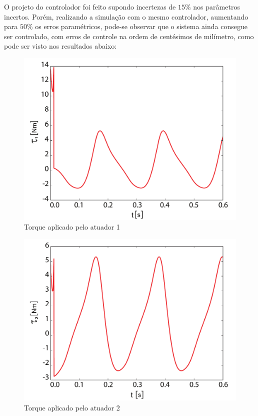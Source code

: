 \documentclass[]{politex}
\begin{document}
O projeto do controlador foi feito supondo incertezas de $15\%$ nos parâmetros incertos. Porém, realizando a simulação com o mesmo controlador, aumentando para $50\%$ os erros paramétricos, pode-se observar que o sistema ainda consegue ser controlado, com erros de controle na ordem de centésimos de milímetro, como pode ser visto nos resultados abaixo: 

\begin{multicols}{2}
\begin{figure}[H]
	\centering
	\includegraphics[scale=0.31]{../figures/Torque12.pdf}  
	\caption{Torque aplicado pelo atuador 1}
	\label{fig:Torque12}
\end{figure}

\begin{figure}[H]
	\centering
	\includegraphics[scale=0.31]{../figures/Torque22.pdf}  
	\caption{Torque aplicado pelo atuador 2}
	\label{fig:Torque22}
\end{figure}
\end{multicols}
\end{document}
